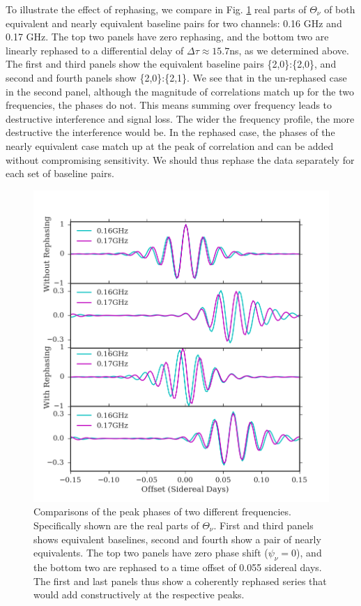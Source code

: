 \documentclass[twocolumn,apj,numberedappendix]{emulateapj}
\renewcommand\[{\begin{equation}}
\renewcommand\]{\end{equation}}
\begin{document}
To illustrate the effect of rephasing, we compare in Fig. \ref{fig:freqdiff} real parts of $\Theta_{\nu}$ of both equivalent and nearly equivalent baseline pairs for two channels: 0.16 GHz and 0.17 GHz. The top two panels have zero rephasing, and the bottom two are linearly rephased to a differential delay of $\Delta\tau\approx15.7$ns, as we determined above. The first and third panels show the equivalent baseline pairs \{2,0\}:\{2,0\}, and second and fourth panels show \{2,0\}:\{2,1\}. We see that in the un-rephased case in the second panel, although the magnitude of correlations match up for the two frequencies, the phases do not. This means summing over frequency leads to destructive interference and signal loss. The wider the frequency profile, the more destructive the interference would be. In the rephased case, the phases of the nearly equivalent case match up at the peak of correlation and can be added without compromising sensitivity. We should thus rephase the data separately for each set of baseline pairs. 

\begin{figure}[H]
\includegraphics[width=1.1\linewidth]{rephs}

\caption{Comparisons of the peak phases of two different frequencies. Specifically shown are the real parts of $\Theta_{\nu}$. First and third panels shows equivalent baselines, second and fourth show a pair of nearly equivalents. The top two panels have zero phase shift ($\psi_{\nu}=0$), and the bottom two are rephased to a time offset of 0.055 sidereal days. The first and last panels thus show a coherently rephased series that would add constructively at the respective peaks. }
\label{fig:freqdiff}
\end{figure}
\end{document}
